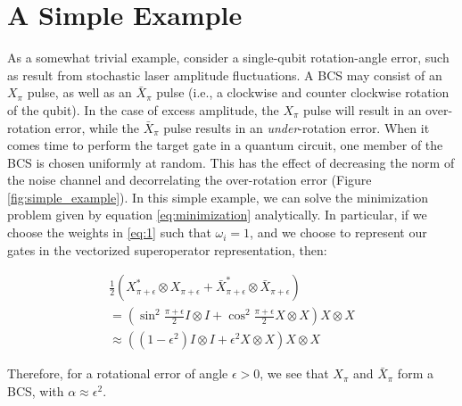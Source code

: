 \documentclass[aps,nofootinbib,pra,notitlepage,twocolumn]{revtex4-1}
\begin{document}
\section{A Simple Example}
As a somewhat trivial example, consider a single-qubit rotation-angle error, such as result from stochastic laser amplitude fluctuations. A BCS may consist of an $X_\pi$ pulse, as well as an $\bar X_\pi$ pulse (i.e., a clockwise and counter clockwise rotation of the qubit). In the case of excess amplitude, the $X_\pi$ pulse will result in an over-rotation error, while the $\bar X_\pi$ pulse results in an \emph{under}-rotation error. When it comes time to perform the target gate in a quantum circuit, one member of the BCS is chosen uniformly at random. This has the effect of decreasing the norm of the noise channel and decorrelating the over-rotation error (Figure \ref{fig:simple_example}). In this simple example, we can solve the minimization problem given by equation \ref{eq:minimization} analytically. In particular, if we choose the weights in \ref{eq:1} such that $\omega_i=1$, and we choose to represent our gates in the vectorized superoperator representation, then:

\begin{equation}
  \begin{gathered}
    \frac{1}{2}(X^*_{\pi + \epsilon}\otimes X_{\pi + \epsilon} + \bar X^*_{\pi + \epsilon}\otimes \bar X_{\pi + \epsilon}) \\  
    = (\sin^2{\frac{\pi + \epsilon}{2}}I\otimes I + \cos^2{\frac{\pi + \epsilon}{2}}X\otimes X)X\otimes X \\
    \approx ((1 - \epsilon^2)I\otimes I + \epsilon^2X\otimes X)X\otimes X
  \end{gathered}
\end{equation}
 
Therefore, for a rotational error of angle $\epsilon > 0$, we see that $X_\pi$ and  $\bar X_\pi$  form a BCS, with $\alpha\approx\epsilon^2$.
\end{document}
